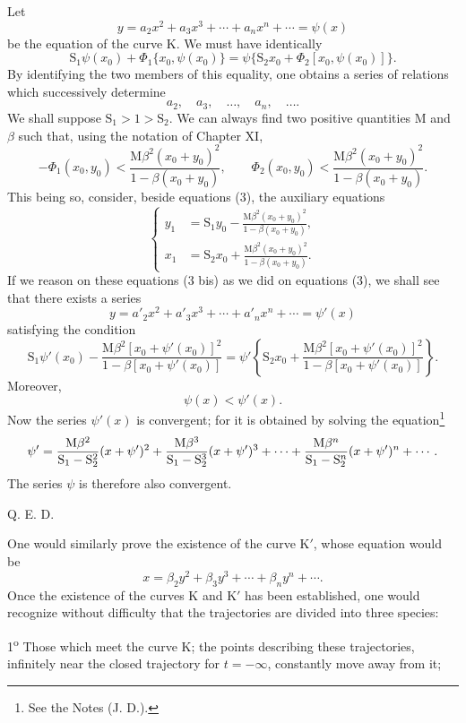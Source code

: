 \documentclass[11pt]{article}
\begin{document}
Let
\[
y=a_2x^2+a_3x^3+\cdots+a_nx^n+\cdots=\psi(x)
\]
be the equation of the curve K. We must have identically
\[
\mathrm{S}_1\psi(x_0)+\Phi_1\{x_0,\psi(x_0)\}
=\psi\{\mathrm{S}_2x_0+\Phi_2[x_0,\psi(x_0)]\}.
\]
By identifying the two members of this equality, one obtains a series of relations which successively determine
\[
a_2,
\quad a_3,
\quad \ldots,
\quad a_n,
\quad \ldots.
\]
We shall suppose $\mathrm{S}_1>1>\mathrm{S}_2$. We can always find two positive quantities $\mathrm{M}$ and $\beta$ such that, using the notation of Chapter XI,
\[
-\Phi_1(x_0,y_0)<\frac{\mathrm{M}\beta^2(x_0+y_0)^2}{1-\beta(x_0+y_0)},
\qquad
\Phi_2(x_0,y_0)<\frac{\mathrm{M}\beta^2(x_0+y_0)^2}{1-\beta(x_0+y_0)}.
\]
This being so, consider, beside equations (3), the auxiliary equations
\begin{equation}
\left\{
\begin{aligned}
y_1&=\mathrm{S}_1y_0-\frac{\mathrm{M}\beta^2(x_0+y_0)^2}{1-\beta(x_0+y_0)},\\
x_1&=\mathrm{S}_2x_0+\frac{\mathrm{M}\beta^2(x_0+y_0)^2}{1-\beta(x_0+y_0)}.
\end{aligned}
\right.
\tag{3 bis}
\end{equation}
If we reason on these equations (3 bis) as we did on equations (3), we shall see that there exists a series
\[
y=a'_2x^2+a'_3x^3+\cdots+a'_nx^n+\cdots=\psi'(x)
\]
satisfying the condition
\[
\mathrm{S}_1\psi'(x_0)-\frac{\mathrm{M}\beta^2[x_0+\psi'(x_0)]^2}{1-\beta[x_0+\psi'(x_0)]}
=\psi'\left\{\mathrm{S}_2x_0+\frac{\mathrm{M}\beta^2[x_0+\psi'(x_0)]^2}{1-\beta[x_0+\psi'(x_0)]}\right\}.
\]
Moreover,
\[
\psi(x)<\psi'(x).
\]
Now the series $\psi'(x)$ is convergent; for it is obtained by solving the equation\footnote{See the Notes (J. D.).}
\[
\psi'=\frac{\mathrm{M}\beta^2}{\mathrm{S}_1-\mathrm{S}_2^2}(x+\psi')^2
+\frac{\mathrm{M}\beta^3}{\mathrm{S}_1-\mathrm{S}_2^3}(x+\psi')^3+\\[-0.2em]
\cdots+
\frac{\mathrm{M}\beta^n}{\mathrm{S}_1-\mathrm{S}_2^n}(x+\psi')^n+\cdots.
\]
The series $\psi$ is therefore also convergent.
\begin{flushright}Q. E. D.\end{flushright}

One would similarly prove the existence of the curve K$'$, whose equation would be
\[
x=\beta_2y^2+\beta_3y^3+\cdots+\beta_ny^n+\cdots.
\]
Once the existence of the curves K and K$'$ has been established, one would recognize without difficulty that the trajectories are divided into three species:

1\textsuperscript{o} Those which meet the curve K; the points describing these trajectories, infinitely near the closed trajectory for $t=-\infty$, constantly move away from it;
\end{document}

